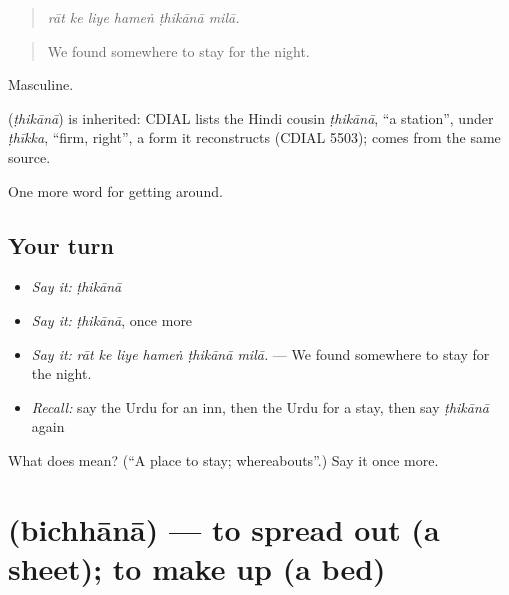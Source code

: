 \begin{quote}
     
\end{quote}

\begin{quote}
\emph{rāt ke liye hameṅ ṭhikānā milā.}
\end{quote}

\begin{quote}
We found somewhere to stay for the night.
\end{quote}

Masculine.

\begin{cousinweb}
\textbf{} (\emph{ṭhikānā}) is inherited: CDIAL lists the Hindi cousin \emph{ṭhikānā}, \textquotedblleft{}a station\textquotedblright{}, under \emph{ṭhīkka}, \textquotedblleft{}firm, right\textquotedblright{}, a form it reconstructs (CDIAL 5503); \textbf{} comes from the same source.
\end{cousinweb}

\begin{grammarlens}[title={What you've built}]
One more word for getting around.
\end{grammarlens}

\subsection*{Your turn}
\begin{itemize}
\raggedright
  \item \emph{Say it:} \emph{ṭhikānā}
  \item \emph{Say it:} \emph{ṭhikānā}, once more
  \item \emph{Say it:} \emph{rāt ke liye hameṅ ṭhikānā milā.} — We found somewhere to stay for the night.
  \item \emph{Recall:} say the Urdu for an inn, then the Urdu for a stay, then say \emph{ṭhikānā} again
\end{itemize}

\begin{tcolorbox}[breakable,colback=teal!4,colframe=teal!35!black,title={Before you move on}]
What does  mean? (\textquotedblleft{}A place to stay; whereabouts\textquotedblright{}.) Say it once more.
\end{tcolorbox}
\section[\texorpdfstring{\ur{بچھانا} (bichhānā)}{بچھانا (bichhānā)}]{ (bichhānā) — to spread out (a sheet); to make up (a bed)}

